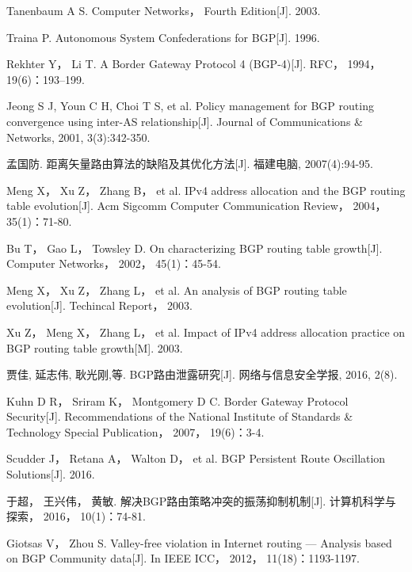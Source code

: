 \documentclass[11pt,twocolumn]{article}
\begin{document}
\begin{thebibliography}{1}
Tanenbaum A S. Computer Networks， Fourth Edition[J]. 2003.

Traina P. Autonomous System Confederations for BGP[J]. 1996.

Rekhter Y， Li T. A Border Gateway Protocol 4 (BGP-4)[J]. RFC， 1994， 19(6)：193--199.

Jeong S J, Youn C H, Choi T S, et al. Policy management for BGP routing convergence using inter-AS relationship[J]. Journal of Communications \& Networks, 2001, 3(3):342-350.

孟国防. 距离矢量路由算法的缺陷及其优化方法[J]. 福建电脑, 2007(4):94-95.

Meng X， Xu Z， Zhang B， et al. IPv4 address allocation and the BGP routing table evolution[J]. Acm Sigcomm Computer Communication Review， 2004， 35(1)：71-80.

Bu T， Gao L， Towsley D. On characterizing BGP routing table growth[J]. Computer Networks， 2002， 45(1)：45-54.

Meng X， Xu Z， Zhang L， et al. An analysis of BGP routing table evolution[J]. Techincal Report， 2003.

Xu Z， Meng X， Zhang L， et al. Impact of IPv4 address allocation practice on BGP routing table growth[M]. 2003.

贾佳, 延志伟, 耿光刚,等. BGP路由泄露研究[J]. 网络与信息安全学报, 2016, 2(8).

Kuhn D R， Sriram K， Montgomery D C. Border Gateway Protocol Security[J]. Recommendations of the National Institute of Standards \& Technology Special Publication， 2007， 19(6)：3-4.

Scudder J， Retana A， Walton D， et al. BGP Persistent Route Oscillation Solutions[J]. 2016.

于超， 王兴伟， 黄敏. 解决BGP路由策略冲突的振荡抑制机制[J]. 计算机科学与探索， 2016， 10(1)：74-81.

Giotsas V， Zhou S. Valley-free violation in Internet routing — Analysis based on BGP Community data[J]. In IEEE ICC， 2012， 11(18)：1193-1197.

\end{thebibliography}
\end{document}

